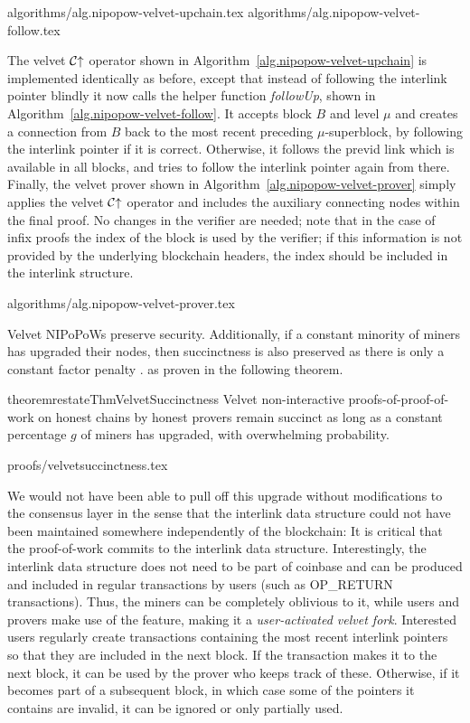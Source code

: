 {algorithms/alg.nipopow-velvet-upchain.tex}
{algorithms/alg.nipopow-velvet-follow.tex}

The velvet $\mathcal{C}\negthickspace\uparrow$ operator shown in
Algorithm~\ref{alg.nipopow-velvet-upchain} is implemented identically as
before, except that instead of following the interlink pointer blindly it now
calls the helper function \textit{followUp}, shown in
Algorithm~\ref{alg.nipopow-velvet-follow}. It accepts block $B$ and level $\mu$
and creates a connection from $B$ back to the most recent preceding
$\mu$-superblock, by following the interlink pointer if it is correct.
Otherwise, it follows the previd link which is available in all blocks, and
tries to follow the interlink pointer again from there. Finally, the velvet
prover shown in Algorithm~\ref{alg.nipopow-velvet-prover} simply applies the
velvet $\mathcal{C}\negthickspace\uparrow$ operator and includes the auxiliary connecting nodes
within the final proof. No changes in the verifier are needed; note that  in the
case of infix proofs the $\mathrm{index}$ of the block is used by the verifier;
if this information is not provided by the underlying blockchain headers, the
index should be included in the interlink structure.

{algorithms/alg.nipopow-velvet-prover.tex}

Velvet NIPoPoWs preserve security.
Additionally, if a constant minority of
miners has upgraded their nodes, then succinctness is also preserved
as there is only a constant factor penalty\ifndss
.
\else
 as proven in the following theorem.
\begin{restatable}{theorem}{restateThmVelvetSuccinctness}
    \label{thm.velvet-succinctness}
    Velvet non-interactive proofs-of-proof-of-work on honest chains by honest
    provers remain succinct as long as a constant percentage $g$ of miners has
    upgraded, with overwhelming probability.
\end{restatable}
{proofs/velvetsuccinctness.tex}
\fi

We would not have been able to pull off this upgrade without modifications to
the consensus layer in the sense that the interlink data structure could not
have been maintained somewhere independently of the blockchain: It is critical
that the proof-of-work commits to the interlink data structure. Interestingly,
the interlink data structure does not need to be part of coinbase and can be
produced and included in regular transactions by users (such as OP\_RETURN
transactions). Thus, the miners can be completely oblivious to it, while users
and provers make use of the feature, making it a \emph{user-activated velvet
fork}. Interested users regularly create transactions containing the most recent
interlink pointers so that they are included in the next block. If the
transaction makes it to the next block, it can be used by the prover who keeps
track of these. Otherwise, if it becomes part of a subsequent block, in which
case some of the pointers it contains are invalid, it can be ignored or only
partially used.

